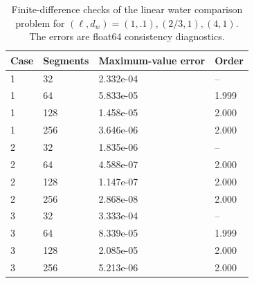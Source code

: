 \begin{table}[htbp]
\centering
\caption{Finite-difference checks of the linear water comparison problem for $(\ell,d_w)=(1,.1),(2/3,1),(4,1)$. The errors are float64 consistency diagnostics.}
\label{tab:water_convergence}
\begin{tabular}{llll}
\toprule
Case & Segments & Maximum-value error & Order \\
\midrule
1 & 32 & 2.332e-04 & -- \\
1 & 64 & 5.833e-05 & 1.999 \\
1 & 128 & 1.458e-05 & 2.000 \\
1 & 256 & 3.646e-06 & 2.000 \\
2 & 32 & 1.835e-06 & -- \\
2 & 64 & 4.588e-07 & 2.000 \\
2 & 128 & 1.147e-07 & 2.000 \\
2 & 256 & 2.868e-08 & 2.000 \\
3 & 32 & 3.333e-04 & -- \\
3 & 64 & 8.339e-05 & 1.999 \\
3 & 128 & 2.085e-05 & 2.000 \\
3 & 256 & 5.213e-06 & 2.000 \\
\bottomrule
\end{tabular}
\end{table}
